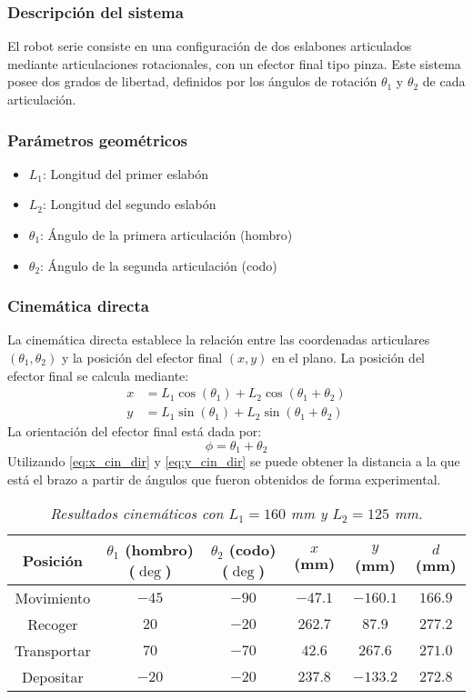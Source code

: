 \subsubsection{Descripción del sistema}
\label{sec:desc_brazo}
El robot serie consiste en una configuración de dos eslabones articulados mediante articulaciones rotacionales, con un efector final tipo pinza. Este sistema posee dos grados de libertad, definidos por los ángulos de rotación $\theta_1$ y $\theta_2$ de cada articulación.
\subsubsection{Parámetros geométricos}
\label{sec:Param_brazo}
\begin{itemize}[label=$\bullet$]
    \item $L_1$: Longitud del primer eslabón
    \item $L_2$: Longitud del segundo eslabón
    \item $\theta_1$: Ángulo de la primera articulación (hombro)
    \item $\theta_2$: Ángulo de la segunda articulación (codo)
\end{itemize}

\subsubsection{Cinemática directa}
La cinemática directa establece la relación entre las coordenadas articulares $(\theta_1, \theta_2)$ y la posición del efector final $(x, y)$ en el plano.
La posición del efector final se calcula mediante:
\begin{align}
x &= L_1 \cos(\theta_1) + L_2 \cos(\theta_1 + \theta_2) \label{eq:x_cin_dir}\\
y &= L_1 \sin(\theta_1) + L_2 \sin(\theta_1 + \theta_2) \label{eq:y_cin_dir}
\end{align}
La orientación del efector final está dada por:
\begin{equation}
\phi = \theta_1 + \theta_2
\end{equation}
Utilizando \ref{eq:x_cin_dir} y \ref{eq:y_cin_dir} se puede obtener la distancia a la que está el brazo a partir de ángulos que fueron obtenidos de forma experimental.
\begin{table}[h]
\centering
\begin{tabular}{|c|c|c|c|c|c|}
\hline
Posición & $\theta_1$ (hombro) ($\deg$) & $\theta_2$ (codo) ($\deg$) & $x$ (mm) & $y$ (mm) & $d$ (mm) \\
\hline
Movimiento & $-45$ & $-90$ & $-47.1$ & $-160.1$ & $166.9$ \\
\hline
Recoger & $20$ & $-20$ & $262.7$ & $87.9$ & $277.2$ \\
\hline
Transportar & $70$ & $-70$ & $42.6$ & $267.6$ & $271.0$ \\
\hline
Depositar & $-20$ & $-20$ & $237.8$ & $-133.2$ & $272.8$ \\
\hline
\end{tabular}
\caption{\textit{Resultados cinemáticos con $L_1 = 160$ mm y $L_2 = 125$ mm.}}
\end{table}


